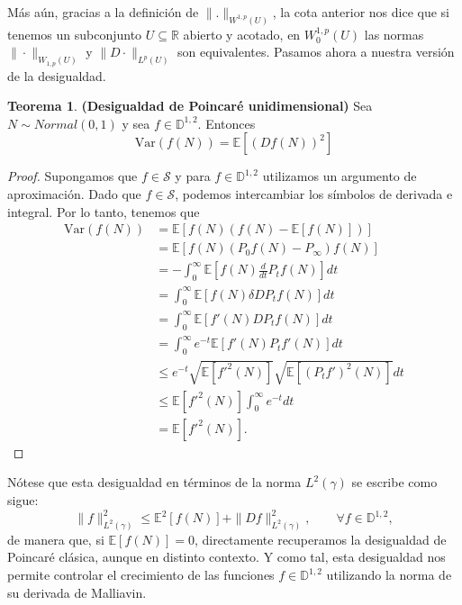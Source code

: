 \documentclass[letterpaper,twoside,12pt]{book}
\newcommand{\R}{\mathbb{R}}
\newcommand{\D}{\mathbb{D}}
\renewcommand{\S}{\mathcal{S}}
\newcommand{\E}{\mathbb{E}}
\newcommand{\1}{\mathds{1}}
\theoremstyle{definition}
\theoremstyle{definition}
\newtheorem{teo}{Teorema}
\theoremstyle{remark}
\theoremstyle{definition}
\theoremstyle{definition}
\theoremstyle{definition}
\theoremstyle{definition}
\theoremstyle{definition}
\begin{document}
   Más aún, gracias a la definición de $\|.\|_{W^{1,p}(U)}$, la cota anterior nos dice que si tenemos un subconjunto $U\subseteq \R$ abierto y acotado, en $W_0^{1,p}(U)$ las normas $\|\cdot\|_{W_{1,p}(U)}$ y $\|D\cdot\|_{L^p(U)}$ son equivalentes. Pasamos ahora a nuestra versión de la desigualdad.
   \begin{teo} \textbf{(Desigualdad de Poincaré unidimensional)} Sea $N\sim Normal(0,1)$ y sea $f\in \D^{1,2}$. Entonces
       \[
       \text{Var}\left(f(N)\right)=\E\left[(Df(N))^2\right]    
       \]     
    \end{teo}
    \begin{proof} 
        Supongamos que $f\in \S$ y para $f\in \D^{1,2}$ utilizamos un argumento de aproximación. Dado que $f\in \S$, podemos intercambiar los símbolos de derivada e integral. Por lo tanto, tenemos que 
        \begin{align*}
            \text{Var}\left(f(N)\right)&=\E\left[f(N)(f(N)-\E\left[f(N)\right])\right]\\
            &=\E\left[f(N)(P_0f(N)-P_\infty)f(N)\right]\\
            &=-\int_{0}^{\infty}\E\left[f(N)\frac{d}{dt}P_tf(N)\right]dt\\
            &=\int_{0}^{\infty}\E\left[f(N)\delta DP_tf(N)\right]dt\\
            &=\int_{0}^{\infty}\E\left[f'(N)DP_tf(N)\right]dt\\
            &=\int_{0}^{\infty}e^{-t}\E\left[f'(N)P_tf'(N)\right]dt\\
            &\leq e^{-t}\sqrt{\E\left[f'^2(N)\right]}\sqrt{\E\left[(P_tf')^2(N)\right]}dt\\
            &\leq \E\left[f'^2(N)\right]\int_{0}^{\infty}e^{-t}dt\\
            &=\E\left[f'^2(N)\right].
        \end{align*} 
     \end{proof}
Nótese que esta desigualdad en términos de la norma $L^2(\gamma)$ se escribe como sigue:
\[
\|f\|^2_{L^2(\gamma)}\leq \E^2\left[f(N)\right]+\|Df\|^2_{L^2(\gamma)}, \qquad \forall f\in \D^{1,2},
\]
de manera que, si $\E\left[f(N)\right]=0$, directamente recuperamos la desigualdad de Poincaré clásica, aunque en distinto contexto. Y como tal, esta desigualdad nos permite controlar el crecimiento de las funciones $f\in \D^{1,2}$ utilizando la norma de su derivada de Malliavin.
\end{document}
